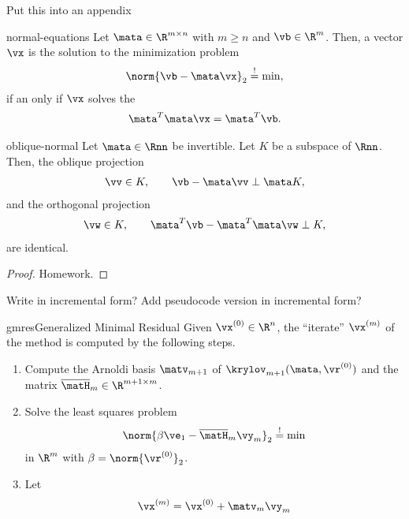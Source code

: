 \begin{todo}
  Put this into an appendix
\end{todo}

\begin{Theorem}{normal-equations}
  Let $\mata\in\R^{m\times n}$ with $m\ge n$ and $\vb\in\R^m$. Then, a vector $\vx$ is the solution to the minimization problem
  \begin{gather}
    \norm{\vb-\mata\vx}_2 \stackrel{!}{=} \min,
  \end{gather}
  if an only if $\vx$ solves the 
  \begin{gather}
    \mata^T\mata\vx = \mata^T \vb.
  \end{gather}
\end{Theorem}

\begin{Lemma}{oblique-normal}
  Let $\mata\in\Rnn$ be invertible. Let $K$ be a subspace of $\Rnn$. Then, the oblique projection
  \begin{gather}
    \vv\in K, \qquad \vb-\mata\vv \perp \mata K,
  \end{gather}
  and the orthogonal projection
  \begin{gather}
    \vw\in K, \qquad \mata^T \vb-\mata^T\mata\vw \perp K,
  \end{gather}
  are identical.
\end{Lemma}

\begin{proof}
  Homework.
\end{proof}

\begin{todo}
  Write in incremental form? Add pseudocode version in incremental form?
\end{todo}

\begin{Algorithm*}{gmres}{Generalized Minimal Residual}
  Given $\vx^{(0)}\in\R^n$, the ``iterate'' $\vx^{(m)}$ of the
   method is computed by the following steps.
  \begin{enumerate}
  \item Compute the Arnoldi basis $\matv_{m+1}$ of
    $\krylov_{m+1}(\mata,\vr^{(0)})$ and the matrix $\overline\matH_m\in\R^{m+1\times m}$.
  \item Solve the least squares problem
    \begin{gather}
      \norm{\beta\ve_1 - \overline\matH_m \vy_m}_2 \stackrel{!}{=} \min
    \end{gather}
    in $\R^m$ with $\beta = \norm{\vr^{(0)}}_2$.
  \item Let
    \begin{gather}
      \vx^{(m)} = \vx^{(0)} + \matv_{m}\vy_m
    \end{gather}
  \end{enumerate}
\end{Algorithm*}

